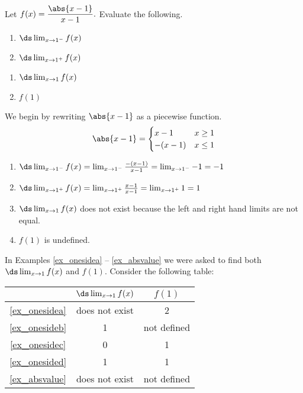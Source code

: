 {Let $f(x) =\dfrac{\abs{x-1}}{x-1}.$ Evaluate the following.\\
\begin{minipage}[t]{.5\textwidth}
	\begin{enumerate}
		\item	$\ds \lim_{x\to 1^-} f(x)$
		\item	$\ds \lim_{x\to 1^+} f(x)$
	\end{enumerate}
\end{minipage}%
\begin{minipage}[t]{.5\textwidth}
	\begin{enumerate}\addtocounter{enumi}{2}
		\item	$\ds \lim_{x\to 1} f(x)$
		\item	$f(1)$
	\end{enumerate}
\end{minipage}}
{We begin by rewriting $\abs{x-1}$ as a piecewise function.
\[\abs{x-1}=\begin{cases}x-1 & x\geq 1 \\ -(x-1) & x\leq 1\end{cases}\]
\begin{enumerate}
\item	$\ds \lim_{x\to 1^-} f(x)=\lim_{x\to 1^-}\frac{-(x-1)}{x-1}=\lim_{x\to 1^-}-1=-1$
\item	$\ds \lim_{x\to 1^+} f(x)=\lim_{x\to 1^+}\frac{x-1}{x-1}=\lim_{x\to 1^+}1=1$
\item 	$\ds \lim_{x\to 1} f(x)$ does not exist because the left and right hand limits are not equal.
\item $f(1)$ is undefined.\eoehere
\end{enumerate}}

In Examples \ref{ex_onesidea} -- \ref{ex_absvalue} we were asked to find both $\ds \lim_{x\to 1}f(x)$ and $f(1)$. Consider the following table:
\begin{center}
\begin{tabular}{ccc}
 & $\ds \lim_{x\to 1}f(x)$ & $f(1)$ \\ \midrule
\autoref{ex_onesidea} & does not exist & 2 \\
\autoref{ex_onesideb} & 1 & not defined \\
\autoref{ex_onesidec} & 0 & 1 \\
\autoref{ex_onesided} & 1 & 1 \\
\autoref{ex_absvalue} & does not exist & not defined
\end{tabular}
\end{center}

